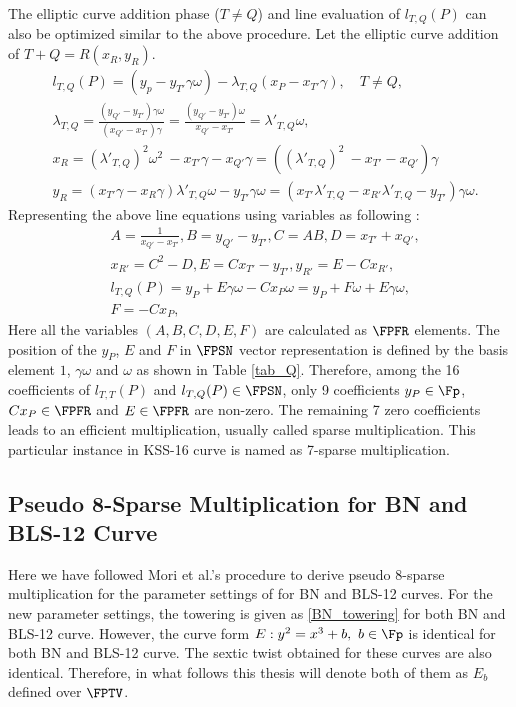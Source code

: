 The elliptic curve addition phase \texorpdfstring{($T\neq Q$)}{} and line evaluation of $ l_{T,Q}(P)$ can also be optimized similar to the above procedure. Let the elliptic curve addition of $T+Q = R(x_R, y_R)$.
\begin{eqnarray}
&  l_{T,Q}(P) = (y_p-y_{T'} \gamma \omega)- \lambda_{T,Q}(x_P-x_{T'}\gamma),  \quad \text{$T \neq Q$,} \nonumber \\
&\lambda_{T,Q}= \frac{( y_{Q'}-y_{T'})\gamma \omega}{( x_{Q'}-x_{T'})\gamma} = \frac{( y_{Q'}-y_{T'}) \omega}{x_{Q'}-x_{T'}} = \lambda'_{T,Q} \omega, \nonumber\\
& x_{R} = (\lambda'_{T,Q})^2 \omega^2 \ - x_{T'}\gamma -  x_{Q'}\gamma = ((\lambda'_{T,Q})^2  \ - x_{T'} -x_{Q'})\gamma \nonumber \\
 & y_{R}= (x_{T'} \gamma-x_{R} \gamma)\lambda'_{T,Q} \omega-y_{T'}\gamma\omega = (x_{T'}\lambda'_{T,Q} -x_{R'}\lambda'_{T,Q}-y_{T'})\gamma \omega \nonumber.
\end{eqnarray}
Representing the above line equations using variables as following :
\begin{eqnarray}
&A=\frac{1}{x_{Q'}-x_{T'}}, B=y_{Q'}-y_{T'}, C=AB, D=x_{T'}+x_{Q'},\nonumber\\
 & x_{R'}=C^2-D, E= Cx_{T'}-y_{T'}, y_{R'}=E-Cx_{R'},\nonumber\\
&l_{T,Q}(P)= y_P+E \gamma \omega-Cx_P\omega = y_P+F\omega+E \gamma \omega, \label{sparse_add}\\
 & F=-Cx_P,  \nonumber
\end{eqnarray}
Here all the variables $(A,B,C, D, E, F)$  are calculated as $\FPFR$ elements.
The  position of the $y_P$, $E$ and $F$ in $\FPSN$ vector representation is defined by the basis element $1$, $\gamma\omega $ and $\omega$ as shown in Table \ref{tab_Q}. 
Therefore,  among the 16 coefficients of  $l_{T,T}(P)$ and $l_{T,Q}(P)\in \FPSN$, only 9 coefficients $y_P\in \Fp$, $Cx_P\in \FPFR$ and $E\in \FPFR$ are  non-zero. The remaining 7 zero coefficients leads to an efficient multiplication, usually called sparse multiplication. This particular instance in KSS-16 curve is named as 7-sparse multiplication.


\subsection{Pseudo 8-Sparse Multiplication for BN and BLS-12 Curve}
Here we have followed Mori et al.'s \cite{PAIRING:MANS13} procedure to derive pseudo 8-sparse multiplication for the parameter settings of \cite{sylvain_new_param} for BN and BLS-12 curves. 
For the new parameter settings, the towering is given as \eqref{BN_towering} for both BN and BLS-12 curve.
However, the curve form $E:y^2=x^3+b, ~b \in \Fp$ is identical for both BN and BLS-12 curve.
The sextic twist obtained for these curves are also identical.
Therefore, in what follows this thesis will denote both of them as $E_b$ defined over $\FPTV$.


